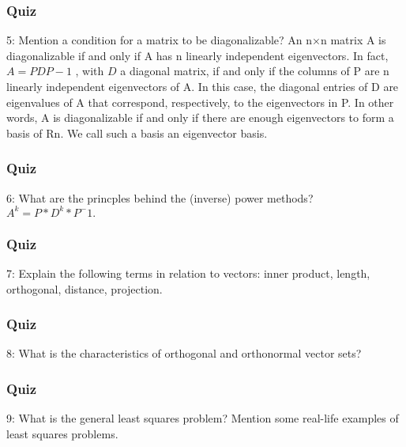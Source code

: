 \subsubsection{Quiz} 5: Mention a condition for a matrix to be diagonalizable?
        An n×n matrix A is diagonalizable if and only if A has n linearly independent eigenvectors.
        In fact,$ A = PDP -1$ , with $D$ a diagonal matrix, if and only if the columns of P are n linearly independent
        eigenvectors of A. In this case, the diagonal entries of D are eigenvalues of A that correspond,
        respectively, to the eigenvectors in P.
        In other words, A is diagonalizable if and only if there are enough eigenvectors to
        form a basis of Rn. We call such a basis an eigenvector basis.

\subsubsection{Quiz} 6: What are the princples behind the (inverse) power methods?
        $A^k = P * D^k * P^-1.$

\subsubsection{Quiz} 7: Explain the following terms in relation to vectors: inner product, length, orthogonal, distance, projection.

\subsubsection{Quiz} 8: What is the characteristics of orthogonal and orthonormal vector sets?

\subsubsection{Quiz} 9: What is the general least squares problem? Mention some real-life examples of least squares problems.

\label{task:20140926_jm0}

